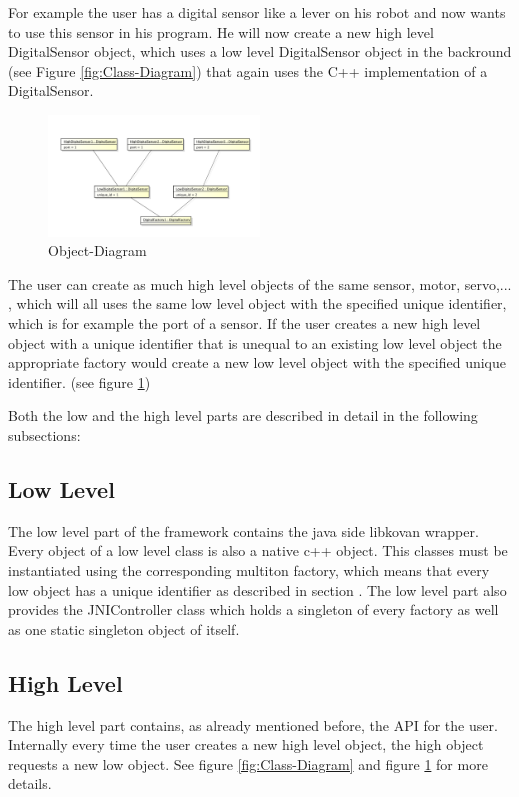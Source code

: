 \documentclass{juniorjournal}
\begin{document}
For example the user has a digital sensor like a lever on his robot and now 
wants to use this sensor in his program. He will now create a new high level 
DigitalSensor object, which uses a low level DigitalSensor object in the 
backround (see Figure \ref{fig:Class-Diagram}) that again uses the C++ implementation of a DigitalSensor.

\begin{figure}[H]
\centering
\includegraphics[width=0.5\textwidth]{images/Object-Diagram.pdf}
\caption{Object-Diagram}
\label{fig:Object-Diagram}
\end{figure}

The user can create as much high level objects of the same sensor, motor, 
servo,... , which will all uses the same low level object with the specified 
unique identifier, which is for example the port of a sensor. If the user 
creates a new high level object with a unique identifier that is unequal to 
an existing low level object the appropriate factory would 
create a new low level object with the specified unique identifier. (see figure \ref{fig:Object-Diagram})

Both the low and the high level parts are described in detail in the following subsections:

\subsection{Low Level}
The low level part of the framework contains the java side libkovan wrapper. 
Every object of a low level class is also a native c++ object.
This classes must be instantiated using the corresponding multiton factory, which means that every low object has a unique identifier as described in section .
The low level part also provides the JNIController class which holds a singleton of every factory as well as one static singleton object of itself.

\subsection{High Level}
The high level part contains, as already mentioned before, the API for the user. 
Internally every time the user creates a new high level object, the high object requests a new low object.
See figure \ref{fig:Class-Diagram} and figure \ref{fig:Object-Diagram} for more details.
\end{document}
